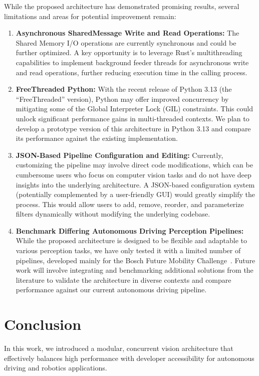 \documentclass[conference]{IEEEtran}
\begin{document}
While the proposed architecture has demonstrated promising results, several limitations and areas for potential improvement remain:

\begin{enumerate}
    \item \textbf{Asynchronous SharedMessage Write and Read Operations:}
    The Shared Memory I/O operations are currently synchronous and could be further optimized.
    A key opportunity is to leverage Rust's multithreading capabilities to implement background feeder threads for asynchronous write and read operations, further reducing execution time in the calling process.

    \item \textbf{FreeThreaded Python:}
    With the recent release of Python 3.13 (the “FreeThreaded” version), Python may offer improved concurrency by mitigating some of the Global Interpreter Lock (GIL) constraints.
    This could unlock significant performance gains in multi-threaded contexts.
    We plan to develop a prototype version of this architecture in Python 3.13 and compare its performance against the existing implementation.

    \item \textbf{JSON-Based Pipeline Configuration and Editing:}
    Currently, customizing the pipeline may involve direct code modifications, which can be cumbersome users who focus on computer vision tasks and do not have deep insights into the underlying architecture.
    A JSON-based configuration system (potentially complemented by a user-friendly GUI) would greatly simplify the process.
    This would allow users to add, remove, reorder, and parameterize filters dynamically without modifying the underlying codebase.

    \item \textbf{Benchmark Differing Autonomous Driving Perception Pipelines:}
    While the proposed architecture is designed to be flexible and adaptable to various perception tasks, we have only tested it with a limited number of pipelines, developed mainly for the Bosch Future Mobility Challenge~\cite{bfmc}.
    Future work will involve integrating and benchmarking additional solutions from the literature to validate the architecture in diverse contexts and compare performance against our current autonomous driving pipeline.

\end{enumerate}

\section{Conclusion}
In this work, we introduced a modular, concurrent vision architecture that effectively balances high performance with developer accessibility for autonomous driving and robotics applications.
\end{document}
